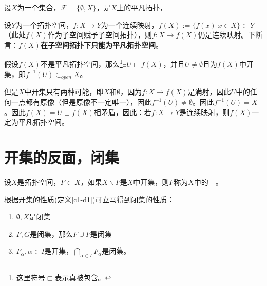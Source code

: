 \documentclass[lang=cn,10pt,device=pad]{elegantbook}
\newcommand{\cusong}{\CJKfamily{cusong}}%
\newcommand{\gn}[1]{~\textcolor{mygrn}{\cusong{#1}}~}
\newcommand{\tp}{\mathscr{F}}
\newcommand{\dajiao}{\displaystyle\bigcap}
\newcommand{\dkh}[1]{\{#1\}}
\begin{document}
\begin{example}[平凡拓扑上的连续映射只能到平凡拓扑]
	设$X$为一个集合，$\tp = \dkh{\emptyset,X}$，是$X$上的平凡拓扑，
	
	设$Y$为一个拓扑空间，$f:X \longrightarrow Y$为一个连续映射，$f(X):=\dkh{f(x)|x\in X}\subset Y$（此处$f(X)$作为子空间赋予子空间拓扑），则$f:X \longrightarrow f(X)$仍是连续映射。下断言：\textbf{$f(X)$在子空间拓扑下只能为平凡拓扑空间}。
	
	假设$f(X)$不是平凡拓扑空间，那么\footnote{这里符号$\sqsubset$表示真被包含。}$\exists U\sqsubset f(X)$，并且$U\neq \emptyset$且为$f(X)$中开集，即$f^{-1}(U)\subset_{open}X$。
	
	但是$X$中开集只有两种可能，即$X$和$\emptyset$，因为$f:X \longrightarrow f(X)$是满射，因此$U$中的任何一点都有原像（但是原像不一定唯一），因此$f^{-1}(U)\neq \emptyset$。因此$f^{-1}(U) = X$。因此$f(X)=U  \sqsubset f(X)$相矛盾，因此：若$f:X \longrightarrow Y$是连续映射，则$f(X)$一定为平凡拓扑空间。
\end{example}

\section{开集的反面，闭集}
\begin{definition}[闭集]
	设$X$是拓扑空间，$F\subset X$，如果$X\backslash F $是$X$中开集，则$F$称为$X$中的\gn{闭集}。
\end{definition}
根据开集的性质(定义\ref{c1-d1})可立马得到闭集的性质：
\begin{proposition}[闭集的性质]
	\begin{enumerate}
		\item $\emptyset , X $是闭集
		\item $F ,G$是闭集，那么$ F \cup F$是闭集
		\item $F_{\alpha} , \alpha\in I $是开集，$\dajiao_{\alpha\in I}F_{\alpha}$是闭集。
	\end{enumerate}
\end{proposition}
\end{document}
